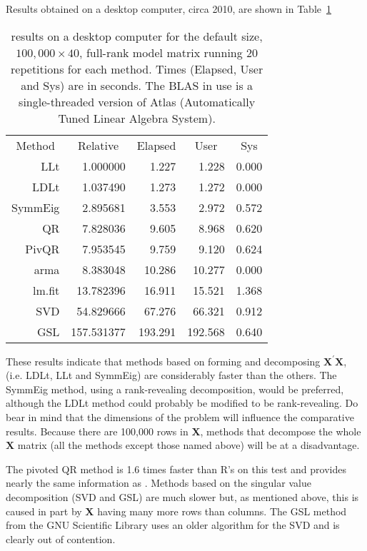 \documentclass[shortnames,article]{jss}
\begin{document}
Results obtained on a desktop computer, circa 2010, are shown in
Table~\ref{tab:lmRes}
\begin{table}[tb]
  \caption{ results on a desktop computer for the
    default size, $100,000\times 40$, full-rank model matrix running
    20 repetitions for each method.  Times (Elapsed, User and Sys) are
    in seconds.  The BLAS in use is a single-threaded version of Atlas
    (Automatically Tuned Linear Algebra System).}
  \label{tab:lmRes}
  \centering
  \begin{tabular}{r r r r r}
    \toprule
    \multicolumn{1}{c}{Method} & \multicolumn{1}{c}{Relative} &
    \multicolumn{1}{c}{Elapsed} & \multicolumn{1}{c}{User} &
    \multicolumn{1}{c}{Sys}\\
    \cmidrule(r){2-5}   %
     LLt &   1.000000 &   1.227 &     1.228 &    0.000 \\
    LDLt &   1.037490 &   1.273 &     1.272 &    0.000 \\
 SymmEig &   2.895681 &   3.553 &     2.972 &    0.572 \\
      QR &   7.828036 &   9.605 &     8.968 &    0.620 \\
   PivQR &   7.953545 &   9.759 &     9.120 &    0.624 \\
    arma &   8.383048 &  10.286 &    10.277 &    0.000 \\
  lm.fit &  13.782396 &  16.911 &    15.521 &    1.368 \\
     SVD &  54.829666 &  67.276 &    66.321 &    0.912 \\
     GSL & 157.531377 & 193.291 &   192.568 &    0.640 \\
     \bottomrule
  \end{tabular}
\end{table}

These results indicate that methods based on forming and decomposing
$\bm X^\prime\bm X$, (i.e. LDLt, LLt and SymmEig) are considerably
faster than the others.  The SymmEig method, using a rank-revealing
decomposition, would be preferred, although the LDLt method could
probably be modified to be rank-revealing.  Do bear in mind that the
dimensions of the problem will influence the comparative results.
Because there are 100,000 rows in $\bm X$, methods that decompose the
whole $\bm X$ matrix (all the methods except those named above) will
be at a disadvantage.

The pivoted QR method is 1.6 times faster than R's  on
this test and provides nearly the same information as .
Methods based on the singular value decomposition (SVD and GSL) are
much slower but, as mentioned above, this is caused in part by $\bm X$
having many more rows than columns.  The GSL method from the GNU
Scientific Library uses an older algorithm for the SVD and is clearly
out of contention.
\end{document}

